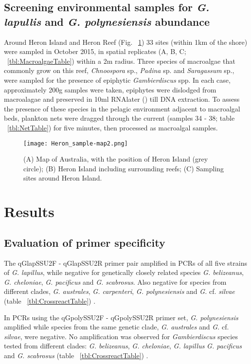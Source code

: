 \documentclass[12pt]{article}
\begin{document}
\subsection{Screening environmental samples for \emph{G. lapullis} and \emph{G. polynesiensis} abundance}
Around Heron Island and Heron Reef (Fig. ~\ref{fig:samplesites}) 33 sites (within 1km of the shore) were sampled in October 2015, in spatial replicates (A, B, C; ~\ref{tbl:MacroalgaeTable}) within a 2m radius. Three species of macroalgae that commonly grow on this reef, \textit{Chnoospora} sp., \textit{Padina} sp. and \textit{Saragassum} sp., were sampled for the presence of epiphytic \emph{Gambierdiscus} spp. In each case, approximately 200g samples were taken, epiphytes were dislodged from macroalagae and preserved in 10ml RNAlater () till DNA extraction.
To assess the presence of these species in the pelagic environment adjacent to macroalgal beds, plankton nets were dragged through the current (samples 34 - 38; table ~\ref{tbl:NetTable}) for five minutes, then processed as macroalgal samples.

\FloatBarrier 
\begin{figure} 
\texttt{[image: Heron\_sample-map2.png]} 
\caption{(A) Map of Australia, with the position of Heron Island (grey circle); (B) Heron Island including surrounding reefs; (C) Sampling sites around Heron Island.} 
\label{fig:samplesites}
\end{figure} 
\FloatBarrier

\newpage
\section{Results}
\subsection{Evaluation of primer specificity}
The qGlapSSU2F - qGlapSSU2R primer pair amplified in PCRs of all five strains of \emph{G. lapillus}, while negative for genetically closely related species \emph{G. belizeanus}, \emph{G. cheloniae}, \emph{G. pacificus} and \emph{G. scabrosus}. Also negative for species from different clades, \emph{G. australes}, \emph{G. carpenteri}, \emph{G. polynesiensis} and \emph{G.} cf. \emph{silvae} (table ~\ref{tbl:CrossreactTable})  \cite{smith2016new,kretzschmar2016characterization}.

In PCRs using the qGpolySSU2F - qGpolySSU2R primer set, \emph{G. polynesiensis} amplified while species from the same genetic clade, \emph{G. australes} and \emph{G.} cf. \emph{silvae}, were negative. No amplification was observed for \emph{Gambierdiscus} species tested from different clades: \emph{G. belizeanus}, \emph{G. cheloniae}, \emph{G. lapillus }\emph{G. pacificus} and \emph{G. scabrosus} (table ~\ref{tbl:CrossreactTable}) \cite{kretzschmar2016characterization}.
\end{document}

